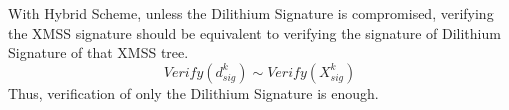 \documentclass[5p,times]{elsarticle}
\theoremstyle{definition}
\theoremstyle{remark}
\numberwithin{equation}{section}
\begin{document}
With Hybrid Scheme, unless the Dilithium Signature is compromised, 
verifying the XMSS signature should be equivalent to verifying the signature of Dilithium Signature of that
XMSS tree.
$$Verify(d_{sig}^k) \sim Verify(X_{sig}^k)$$
Thus, verification of only the Dilithium Signature is enough.





\end{document}
